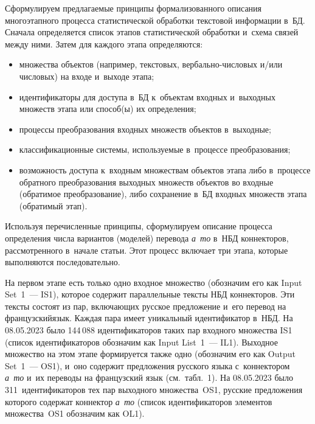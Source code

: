 \begin{multicols}{2}
   Сформулируем предлагаемые принципы формализованного описания 
многоэтапного процесса ста\-ти\-сти\-че\-ской обработки текс\-то\-вой информации в~БД. 
Сначала определяется список этапов ста\-ти\-сти\-че\-ской обработки и~схема связей 
меж\-ду ними. Затем для каж\-до\-го этапа опре\-де\-ля\-ются:
   \begin{itemize}
   \item множества объектов (например, текстовых, вер\-баль\-но-чис\-ло\-вых 
и/или чис\-ло\-вых) на входе и~выходе \mbox{этапа};
   \item идентификаторы для доступа в~БД к~объектам входных и~выходных 
множеств этапа или способ(ы) их опре\-де\-ле\-ния;
   \item процессы преобразования входных множеств объектов в~выходные;
   \item классификационные сис\-те\-мы, ис\-поль\-зу\-емые в~процессе пре\-обра\-зо\-ва\-ния;
   \item возможность до\-сту\-па к~входным множествам объектов этапа либо 
в~процессе обратного преобразования выходных множеств объектов во входные 
(обратимое преобразование), либо сохранение в~БД вход\-ных множеств этапа 
(обратимый этап).
   \end{itemize}
   
   Используя перечисленные принципы, сформулируем описание процесса 
определения чис\-ла вариантов (моделей) перевода \textit{а~то} в~НБД 
коннекторов, рас\-смот\-рен\-но\-го в~начале \mbox{статьи}. Этот процесс включает три этапа, 
которые выполняются по\-сле\-до\-ва\-тельно.
   
   На первом этапе есть только одно входное множество (обозначим его как Input 
Set~1~--- IS1), которое содержит параллельные текс\-ты НБД коннекторов. Эти 
текс\-ты со\-ст\-оят из пар, вклю\-ча\-ющих русское предложение и~его перевод на 
французский\linebreak язык. Каждая пара имеет уникальный идентификатор в~НБД. На 
08.05.2023 было 144\,088 идентификаторов таких пар вход\-но\-го множества IS1\linebreak 
(список идентификаторов обозначим как Input List~1~--- IL1). Выходное 
множество на этом этапе формируется так\-же одно (обозначим его как Output 
Set~1~--- OS1), и~оно содержит предложения русского языка с~коннектором 
\textit{а~то} и~их переводы на французский язык (см.\ табл.~1). На 08.05.2023 
было 311~идентификаторов тех пар вы\-ход\-но\-го множества~OS1, рус\-ские 
предложения которого содержат коннектор \textit{а~то} (список 
идентификаторов элементов множества~OS1 обозначим как OL1).
   

\end{multicols}
